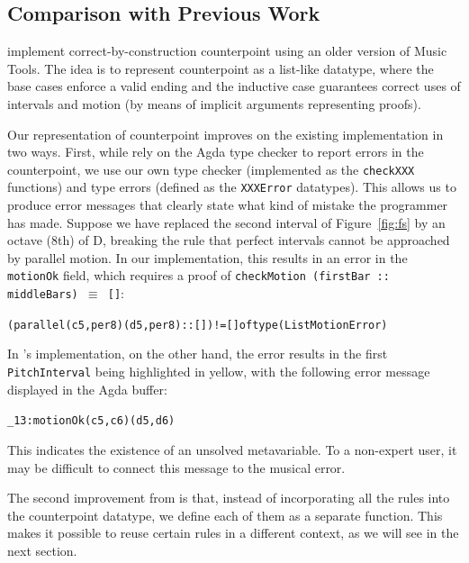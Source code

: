 \subsection{Comparison with Previous Work}
\label{sec:cp:comp}

\citet{cong-cp} implement correct-by-construction counterpoint
using an older version of Music Tools.
The idea is to represent counterpoint as a list-like datatype,
where the base cases enforce a valid ending and the inductive case
guarantees correct uses of intervals and motion (by means of
implicit arguments representing proofs).

Our representation of counterpoint improves on the existing
implementation in two ways.
First, while \citet{cong-cp} rely on the Agda type checker to report
errors in the counterpoint, we use our own type checker (implemented
as the \texttt{checkXXX} functions) and type errors (defined as the
\texttt{XXXError} datatypes).
This allows us to produce error messages that clearly state what
kind of mistake the programmer has made.
Suppose we have replaced the second interval of Figure~\ref{fig:fs} by
an octave (8th) of D, breaking the rule that perfect intervals cannot
be approached by parallel motion.
In our implementation, this results in an error in the
\texttt{motionOk} field, which requires a proof of
\texttt{checkMotion (firstBar :: middleBars) \(\equiv\) []}:

\begin{alltt}
(parallel (c 5 , per8) (d 5 , per8) :: []) != [] of type (List MotionError)
\end{alltt}

\noindent In \citet{cong-cp}'s implementation, on the other hand,
the error results in the first \texttt{PitchInterval} being
highlighted in yellow, with the following error message displayed
in the Agda buffer:

\begin{alltt}
\_13 : motionOk (c 5 , c 6) (d 5 , d 6)
\end{alltt}

\noindent This indicates the existence of an unsolved metavariable.
To a non-expert user, it may be difficult to connect this message to
the musical error.

The second improvement from \citet{cong-cp} is that, instead of
incorporating all the rules into the counterpoint datatype, we define
each of them as a separate function.
This makes it possible to reuse certain rules in a different context,
as we will see in the next section.
